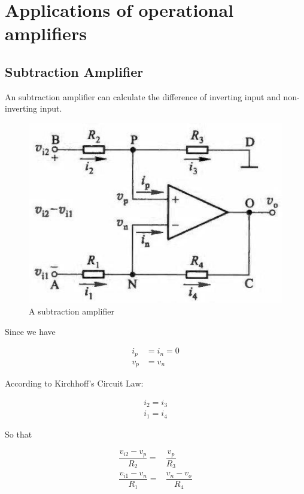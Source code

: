 \section{Applications of operational amplifiers}

\subsection{Subtraction Amplifier}

An subtraction amplifier can calculate the difference of inverting input and non-inverting input.

\begin{figure}[H]
  \centering
  \includegraphics[width=0.5\linewidth]{figures/subtraction-amplifier}
  \caption{A subtraction amplifier}
  \label{fig:}
\end{figure}

Since we have

\begin{equation*}
  \begin{aligned}
    i_p &= i_n = 0 \\
    v_p &= v_n
  \end{aligned}
\end{equation*}

According to Kirchhoff's Circuit Law:

\begin{equation*}
  \begin{aligned}
    i_2 = i_3 \\
    i_1 = i_4
  \end{aligned}
\end{equation*}

So that

\begin{equation*}
  \begin{aligned}
    \dfrac{v_{i2} - v_p}{R_2} =& \dfrac{v_p}{R_3} \\
    \dfrac{v_{i1} - v_n}{R_1} =& \dfrac{v_n - v_o}{R_4}  
  \end{aligned}
\end{equation*}

